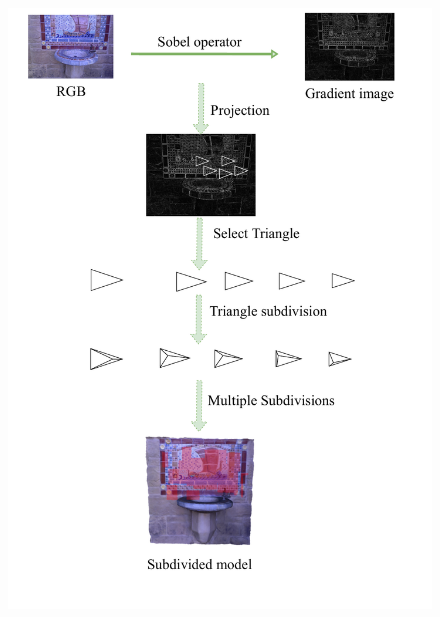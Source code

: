 \begin{figure}[ht]
    \centering
    \includegraphics[height=0.5\textheight,keepaspectratio]{pic/work2/Mesh_subdiv.pdf}
    \label{fig:subdivion}
\end{figure}

